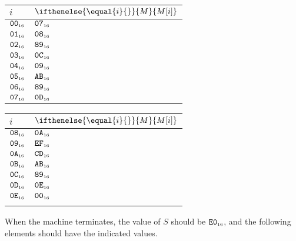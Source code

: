 \documentclass[a4paper,12pt]{article}
\makeatletter
\newcommand{\num}[1]{\texttt{#1}}
\newcommand{\hex}[1]{\num{#1}_{\textup{\tiny 16}}}
\newcommand{\MEM}[1]{\ifthenelse{\equal{#1}{}}{M}{M[#1]}}
\newcommand{\SP}{S}
\newenvironment{memtable}{%
  \begin{trivlist}
    \item
    }{%
    \end{trivlist}}
\newenvironment{memcolumn}{%
  \begin{tabular}{@{}ll@{}}
    $i$ & $\MEM{i}$ \\
    \hline}
    {%
  \end{tabular}}
\newcommand{\memspace}{\qquad}
\makeatother
\begin{document}
\begin{memtable}
  \begin{memcolumn}
    $\hex{00}$ & $\hex{07}$ \\
    $\hex{01}$ & $\hex{08}$ \\
    $\hex{02}$ & $\hex{89}$ \\
    $\hex{03}$ & $\hex{0C}$ \\
    $\hex{04}$ & $\hex{09}$ \\
    $\hex{05}$ & $\hex{AB}$ \\
    $\hex{06}$ & $\hex{89}$ \\
    $\hex{07}$ & $\hex{0D}$ \\
  \end{memcolumn}
  \memspace
  \begin{memcolumn}
    $\hex{08}$ & $\hex{0A}$ \\
    $\hex{09}$ & $\hex{EF}$ \\
    $\hex{0A}$ & $\hex{CD}$ \\
    $\hex{0B}$ & $\hex{AB}$ \\
    $\hex{0C}$ & $\hex{89}$ \\
    $\hex{0D}$ & $\hex{0E}$ \\
    $\hex{0E}$ & $\hex{00}$ \\
    \\
  \end{memcolumn}
\end{memtable}
When the machine terminates, the value of $\SP$ should be $\hex{E0}$, and the following elements should have the indicated values.
\end{document}
